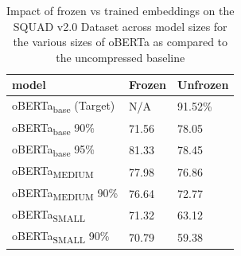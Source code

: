\begin{table}[!ht]
    \centering
    \begin{tabular}{|l|l|l|}
    \hline
        model & Frozen & Unfrozen \\ \hline
        oBERTa\textsubscript{base} (Target) & N/A & 91.52\% \\ \hline
        oBERTa\textsubscript{base} 90\% & 71.56 & 78.05 \\ \hline
        oBERTa\textsubscript{base} 95\% & 81.33 & 78.45 \\ \hline
        oBERTa\textsubscript{MEDIUM} & 77.98 & 76.86 \\ \hline
        oBERTa\textsubscript{MEDIUM} 90\% & 76.64 & 72.77 \\ \hline
        oBERTa\textsubscript{SMALL} & 71.32 & 63.12 \\ \hline
        oBERTa\textsubscript{SMALL} 90\% & 70.79 & 59.38 \\ \hline
    \end{tabular}
    \caption{Impact of frozen vs trained embeddings on the SQUAD v2.0 Dataset across model sizes for the various sizes of oBERTa as compared to the uncompressed baseline}
    \label{tab:squad2-freeze}
\end{table}
